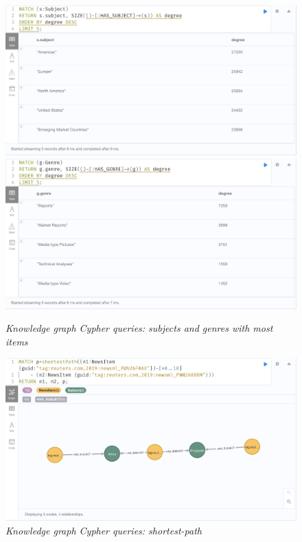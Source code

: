 \documentclass[11pt]{article}
\begin{document}
\begin{figure}
  \includegraphics[scale=0.2]{02-subjects-with-most-items}
  \includegraphics[scale=0.2]{02-genres-with-most-items}
  \caption{\textit{Knowledge graph Cypher queries: subjects and genres with most items}}
\end{figure}

\begin{figure}
  \centerline{\includegraphics[scale=0.2]{03-shortest-path}}
  \caption{\textit{Knowledge graph Cypher queries: shortest-path}}
\end{figure}
\end{document}
